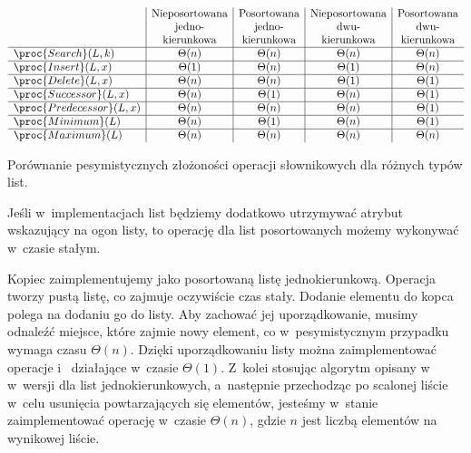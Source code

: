 \begin{table}[ht]
	\begin{center}
		\[
			\begin{array}{l|c|c|c|c}
				& \text{Nieposortowana} & \text{Posortowana} & \text{Nieposortowana} & \text{Posortowana} \\
				& \text{jedno-} & \text{jedno-} & \text{dwu-} & \text{dwu-} \\
				& \text{kierunkowa} & \text{kierunkowa} & \text{kierunkowa} & \text{kierunkowa} \\
				\hline
				\proc{Search}(L,k) & \Theta(n) & \Theta(n) & \Theta(n) & \Theta(n) \\
				\hline
				\proc{Insert}(L,x) & \Theta(1) & \Theta(n) & \Theta(1) & \Theta(n) \\
				\hline
				\proc{Delete}(L,x) & \Theta(n) & \Theta(n) & \Theta(1) & \Theta(1) \\
				\hline
				\proc{Successor}(L,x) & \Theta(n) & \Theta(1) & \Theta(n) & \Theta(1) \\
				\hline
				\proc{Predecessor}(L,x) & \Theta(n) & \Theta(n) & \Theta(n) & \Theta(1) \\
				\hline
				\proc{Minimum}(L) & \Theta(n) & \Theta(1) & \Theta(n) & \Theta(1) \\
				\hline
				\proc{Maximum}(L) & \Theta(n) & \Theta(n) & \Theta(n) & \Theta(n)
			\end{array}
		\]
	\end{center}
	\caption{Porównanie pesymistycznych złożoności operacji słownikowych dla różnych typów list.} \label{tab:10-1}
\end{table}
Jeśli w~implementacjach list będziemy dodatkowo utrzymywać atrybut  wskazujący na ogon listy, to operację  dla list posortowanych możemy wykonywać w~czasie stałym.


\subproblem %
Kopiec zaimplementujemy jako posortowaną listę jednokierunkową. Operacja  tworzy pustą listę, co zajmuje oczywiście czas stały. Dodanie elementu do kopca polega na dodaniu go do listy. Aby zachować jej uporządkowanie, musimy odnaleźć miejsce, które zajmie nowy element, co w~pesymistycznym przypadku wymaga czasu $\Theta(n)$. Dzięki uporządkowaniu listy można zaimplementować operacje  i~ działające w~czasie $\Theta(1)$. Z~kolei stosując algorytm opisany w~ w~wersji dla list jednokierunkowych, a~następnie przechodząc po scalonej liście w~celu usunięcia powtarzających się elementów, jesteśmy w~stanie zaimplementować operację  w~czasie $\Theta(n)$, gdzie $n$ jest liczbą elementów na wynikowej liście.

